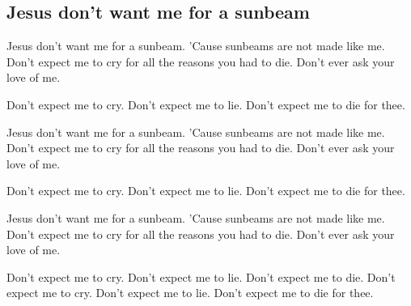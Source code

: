 \subsection*{Jesus don't want me for a sunbeam   }
\begin{guitar}
Jesus don't want me for a sunbeam. 
'Cause sunbeams are not made like me.
Don't expect me to cry for all the reasons you had to die. 
Don't ever ask your love of me.



Don't expect me to cry.
Don't expect me to lie.
Don't expect me to die for thee.



Jesus don't want me for a sunbeam. 
'Cause sunbeams are not made like me.
Don't expect me to cry for all the reasons you had to die. 
Don't ever ask your love of me.



Don't expect me to cry.
Don't expect me to lie.
Don't expect me to die for thee.



Jesus don't want me for a sunbeam. 
'Cause sunbeams are not made like me.
Don't expect me to cry for all the reasons you had to die. 
Don't ever ask your love of me.



Don't expect me to cry.
Don't expect me to lie.
Don't expect me to die.
Don't expect me to cry.
Don't expect me to lie.
Don't expect me to die for thee. 
\end{guitar}
